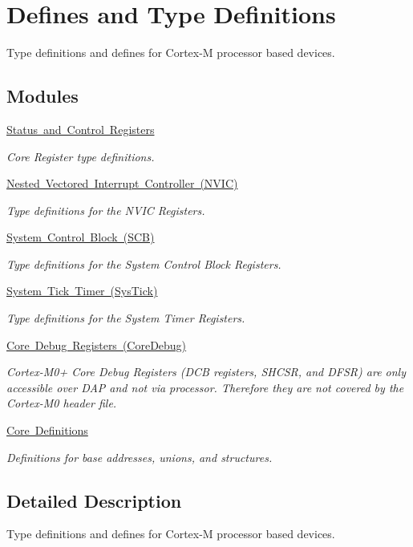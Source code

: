 \hypertarget{group___c_m_s_i_s__core__register}{}\section{Defines and Type Definitions}
\label{group___c_m_s_i_s__core__register}


Type definitions and defines for Cortex-\/M processor based devices.  


\subsection*{Modules}
\begin{DoxyCompactItemize}
\item 
\mbox{\hyperlink{group___c_m_s_i_s___c_o_r_e}{Status and Control Registers}}
\begin{DoxyCompactList}\small\item\em Core Register type definitions. \end{DoxyCompactList}\item 
\mbox{\hyperlink{group___c_m_s_i_s___n_v_i_c}{Nested Vectored Interrupt Controller (\+N\+V\+I\+C)}}
\begin{DoxyCompactList}\small\item\em Type definitions for the N\+V\+IC Registers. \end{DoxyCompactList}\item 
\mbox{\hyperlink{group___c_m_s_i_s___s_c_b}{System Control Block (\+S\+C\+B)}}
\begin{DoxyCompactList}\small\item\em Type definitions for the System Control Block Registers. \end{DoxyCompactList}\item 
\mbox{\hyperlink{group___c_m_s_i_s___sys_tick}{System Tick Timer (\+Sys\+Tick)}}
\begin{DoxyCompactList}\small\item\em Type definitions for the System Timer Registers. \end{DoxyCompactList}\item 
\mbox{\hyperlink{group___c_m_s_i_s___core_debug}{Core Debug Registers (\+Core\+Debug)}}
\begin{DoxyCompactList}\small\item\em Cortex-\/\+M0+ Core Debug Registers (D\+CB registers, S\+H\+C\+SR, and D\+F\+SR) are only accessible over D\+AP and not via processor. Therefore they are not covered by the Cortex-\/\+M0 header file. \end{DoxyCompactList}\item 
\mbox{\hyperlink{group___c_m_s_i_s__core__base}{Core Definitions}}
\begin{DoxyCompactList}\small\item\em Definitions for base addresses, unions, and structures. \end{DoxyCompactList}\end{DoxyCompactItemize}


\subsection{Detailed Description}
Type definitions and defines for Cortex-\/M processor based devices. 

